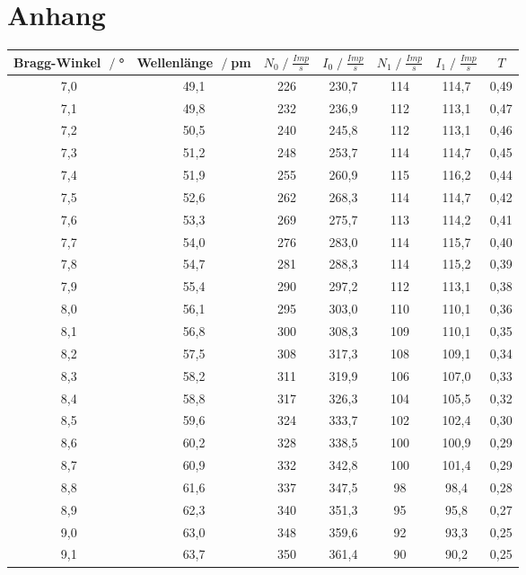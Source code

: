 \newpage
\section{Anhang}
\begin{table}[H]
    \centering
    \begin{tabular}{c | c | c | c | c | c | c}
    Bragg-Winkel $\;/\;$°& Wellenlänge $\;/\;$pm & $N_0 \;/\;\frac{\si{Imp}}{s}$ & $I_0 \;/\;\frac{Imp}{s}$ &
    $N_1\;/\;\frac{Imp}{s}$ & $I_1\;/\;\frac{Imp}{s}$ & $T$\\
    \midrule
        7,0 & 49,1 & 226 & 230,7 & 114 & 114,7 & 0,49\\
        7,1 & 49,8 & 232 & 236,9 & 112 & 113,1 & 0,47\\
        7,2 & 50,5 & 240 & 245,8 & 112 & 113,1 & 0,46\\
        7,3 & 51,2 & 248 & 253,7 & 114 & 114,7 & 0,45\\
        7,4 & 51,9 & 255 & 260,9 & 115 & 116,2 & 0,44\\
        7,5 & 52,6 & 262 & 268,3 & 114 & 114,7 & 0,42\\
        7,6 & 53,3 & 269 & 275,7 & 113 & 114,2 & 0,41\\
        7,7 & 54,0 & 276 & 283,0 & 114 & 115,7 & 0,40\\
        7,8 & 54,7 & 281 & 288,3 & 114 & 115,2 & 0,39\\
        7,9 & 55,4 & 290 & 297,2 & 112 & 113,1 & 0,38\\
        8,0 & 56,1 & 295 & 303,0 & 110 & 110,1 & 0,36\\
        8,1 & 56,8 & 300 & 308,3 & 109 & 110,1 & 0,35\\
        8,2 & 57,5 & 308 & 317,3 & 108 & 109,1 & 0,34\\
        8,3 & 58,2 & 311 & 319,9 & 106 & 107,0 & 0,33\\
        8,4 & 58,8 & 317 & 326,3 & 104 & 105,5 & 0,32\\
        8,5 & 59,6 & 324 & 333,7 & 102 & 102,4 & 0,30\\
        8,6 & 60,2 & 328 & 338,5 & 100 & 100,9 & 0,29\\
        8,7 & 60,9 & 332 & 342,8 & 100 & 101,4 & 0,29\\
        8,8 & 61,6 & 337 & 347,5 & 98 & 98,4 & 0,28\\
        8,9 & 62,3 & 340 & 351,3 & 95 & 95,8 & 0,27\\
        9,0 & 63,0 & 348 & 359,6 & 92 & 93,3 & 0,25\\
        9,1 & 63,7 & 350 & 361,4 & 90 & 90,2 & 0,25\\

\end{tabular}
\end{table}
